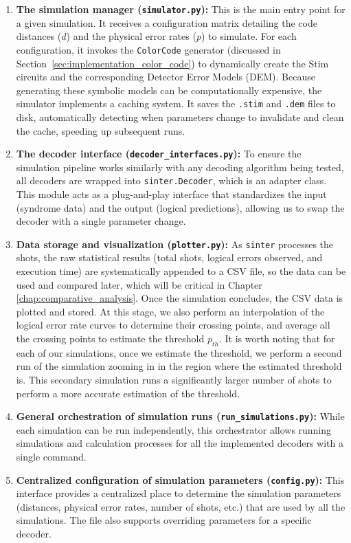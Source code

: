 \begin{enumerate}
    \item \textbf{The simulation manager (\texttt{simulator.py}):} This is the main entry point for a given simulation. It receives a configuration matrix detailing the code distances ($d$) and the physical error rates ($p$) to simulate. For each configuration, it invokes the \texttt{ColorCode} generator (discussed in Section~\ref{sec:implementation_color_code}) to dynamically create the Stim circuits and the corresponding Detector Error Models (DEM). Because generating these symbolic models can be computationally expensive, the simulator implements a caching system. It saves the \texttt{.stim} and \texttt{.dem} files to disk, automatically detecting when parameters change to invalidate and clean the cache, speeding up subsequent runs.
    
    \item \textbf{The decoder interface (\texttt{decoder\_interfaces.py}):} To ensure the simulation pipeline works similarly with any decoding algorithm being tested, all decoders are wrapped into \texttt{sinter.Decoder}, which is an adapter class. This module acts as a plug-and-play interface that standardizes the input (syndrome data) and the output (logical predictions), allowing us to swap the decoder with a single parameter change.
    
    \item \textbf{Data storage and visualization (\texttt{plotter.py}):} As \texttt{sinter} processes the shots, the raw statistical results (total shots, logical errors observed, and execution time) are systematically appended to a CSV file, so the data can be used and compared later, which will be critical in Chapter \ref{chap:comparative_analysis}. Once the simulation concludes, the CSV data is plotted and stored. At this stage, we also perform an interpolation of the logical error rate curves to determine their crossing points, and average all the crossing points to estimate the threshold $p_{th}$. It is worth noting that for each of our simulations, once we estimate the threshold, we perform a second run of the simulation zooming in in the region where the estimated threshold is. This secondary simulation runs a significantly larger number of shots to perform a more accurate estimation of the threshold.

    \item \textbf{General orchestration of simulation runs (\texttt{run\_simulations.py}):} While each simulation can be run independently, this orchestrator allows running simulations and calculation processes for all the implemented decoders with a single command.

    \item \textbf{Centralized configuration of simulation parameters (\texttt{config.py}):} This interface provides a centralized place to determine the simulation parameters (distances, physical error rates, number of shots, etc.) that are used by all the simulations. The file also supports overriding parameters for a specific decoder.
\end{enumerate}

